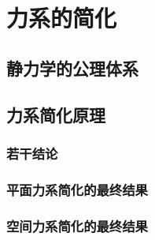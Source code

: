 

\section{力系的简化}\label{4-2}

\subsection{静力学的公理体系}\label{4-2-1}

\subsection{力系简化原理}\label{4-2-2}

\subsubsection{若干结论}\label{4-2-2-1}

\subsubsection{平面力系简化的最终结果}\label{4-2-2-2}

\subsubsection{空间力系简化的最终结果}\label{4-2-2-3}